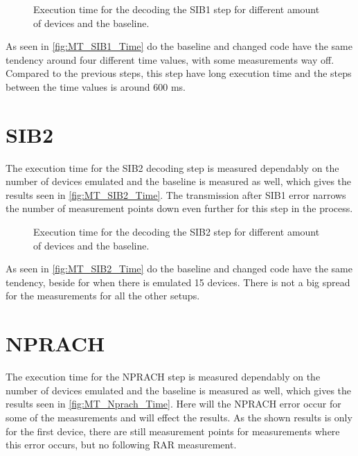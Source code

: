 \begin{figure}[H]
\centering
\resizebox{0.5\textwidth}{!}{
}
\caption{Execution time for the decoding the SIB1 step for different amount of devices and the baseline.}
\label{fig:MT_SIB1_Time}
\end{figure}

As seen in \autoref{fig:MT_SIB1_Time} do the baseline and changed code have the same tendency around four different time values, with some measurements way off. Compared to the previous steps, this step have long execution time and the steps between the time values is around 600 ms.

\section{SIB2}
The execution time for the SIB2 decoding step is measured dependably on the number of devices emulated and the baseline is measured as well, which gives the results seen in \autoref{fig:MT_SIB2_Time}. The transmission after SIB1 error narrows the number of measurement points down even further for this step in the process.

\begin{figure}[H]
\centering
\resizebox{0.5\textwidth}{!}{
}
\caption{Execution time for the decoding the SIB2 step for different amount of devices and the baseline.}
\label{fig:MT_SIB2_Time}
\end{figure}

As seen in \autoref{fig:MT_SIB2_Time} do the baseline and changed code have the same tendency, beside for when there is emulated 15 devices. There is not a big spread for the measurements for all the other setups.

\section{NPRACH}
The execution time for the NPRACH step is measured dependably on the number of devices emulated and the baseline is measured as well, which gives the results seen in \autoref{fig:MT_Nprach_Time}. Here will the NPRACH error occur for some of the measurements and will effect the results. As the shown results is only for the first device, there are still measurement points for measurements where this error occurs, but no following RAR measurement.

